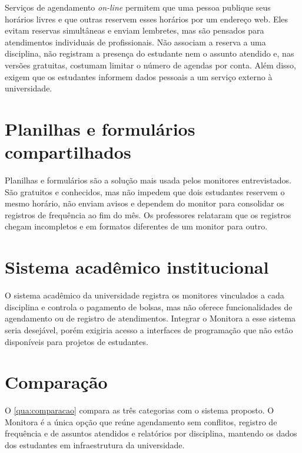 Serviços de agendamento \emph{on-line} permitem que uma pessoa publique seus
horários livres e que outras reservem esses horários por um endereço web.
Eles evitam reservas simultâneas e enviam lembretes, mas são pensados para
atendimentos individuais de profissionais. Não associam a reserva a uma
disciplina, não registram a presença do estudante nem o assunto atendido e,
nas versões gratuitas, costumam limitar o número de agendas por conta. Além
disso, exigem que os estudantes informem dados pessoais a um serviço externo
à universidade.

\section{Planilhas e formulários compartilhados}

Planilhas e formulários são a solução mais usada pelos monitores entrevistados.
São gratuitos e conhecidos, mas não impedem que dois estudantes reservem o
mesmo horário, não enviam avisos e dependem do monitor para consolidar os
registros de frequência ao fim do mês. Os professores relataram que os
registros chegam incompletos e em formatos diferentes de um monitor para outro.

\section{Sistema acadêmico institucional}

O sistema acadêmico da universidade registra os monitores vinculados a cada
disciplina e controla o pagamento de bolsas, mas não oferece funcionalidades
de agendamento ou de registro de atendimentos. Integrar o Monitora a esse
sistema seria desejável, porém exigiria acesso a interfaces de programação
que não estão disponíveis para projetos de estudantes.

\section{Comparação}

O \cref{qua:comparacao} compara as três categorias com o sistema proposto. O
Monitora é a única opção que reúne agendamento sem conflitos, registro de
frequência e de assuntos atendidos e relatórios por disciplina, mantendo os
dados dos estudantes em infraestrutura da universidade.

